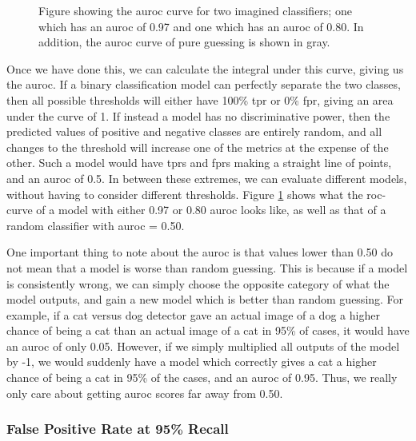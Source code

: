 \documentclass[UKenglish]{uiomasterthesis} %
\theoremstyle{definition}
\begin{document}
\begin{figure}[hbtp]
    \begin{center}
        
    \end{center}
    \caption[AUROC example figure]{Figure showing the \ac{auroc} curve for two imagined classifiers; one which has an \ac{auroc} of 0.97 and one which has an \ac{auroc} of 0.80. In addition, the \ac{auroc} curve of pure guessing is shown in gray.}
    \label{fig:auroc}
\end{figure}

Once we have done this, we can calculate the integral under this curve, giving us the \ac{auroc}. If a binary classification model can perfectly separate the two classes, then all possible thresholds will either have 100\% \ac{tpr} or 0\% \ac{fpr}, giving an area under the curve of 1. If instead a model has no discriminative power, then the predicted values of positive and negative classes are entirely random, and all changes to the threshold will increase one of the metrics at the expense of the other. Such a model would have \acp{tpr} and \acp{fpr} making a straight line of points, and an \ac{auroc} of 0.5. In between these extremes, we can evaluate different models, without having to consider different thresholds. Figure \ref{fig:auroc} shows what the \ac{roc}-curve of a model with either 0.97 or 0.80 \ac{auroc} looks like, as well as that of a random classifier with \ac{auroc} = 0.50. 

One important thing to note about the \ac{auroc} is that values lower than 0.50 do not mean that a model is worse than random guessing. This is because if a model is consistently wrong, we can simply choose the opposite category of what the model outputs, and gain a new model which is better than random guessing. For example, if a cat versus dog detector gave an actual image of a dog a higher chance of being a cat than an actual image of a cat in 95\% of cases, it would have an \ac{auroc} of only 0.05. However, if we simply multiplied all outputs of the model by -1, we would suddenly have a model which correctly gives a cat a higher chance of being a cat in 95\% of the cases, and an \ac{auroc} of 0.95. Thus, we really only care about getting \ac{auroc} scores far away from 0.50.\\

\subsubsection{False Positive Rate at 95\% Recall}
\end{document}
